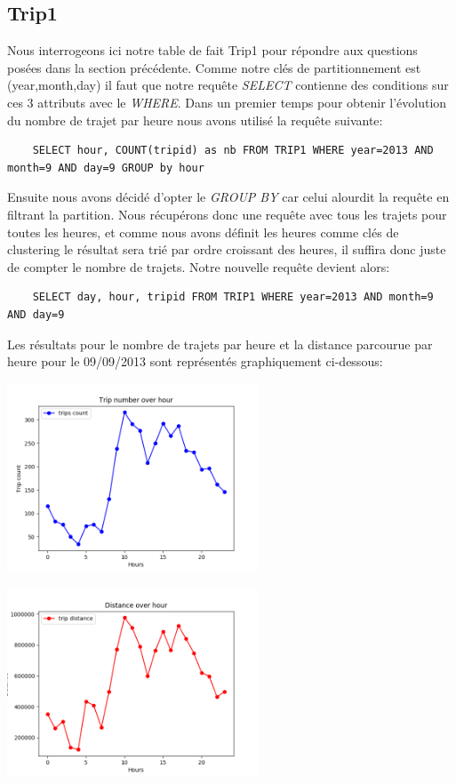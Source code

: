 \documentclass[]{report}
\begin{document}
	\subsection{Trip1}
	Nous interrogeons ici notre table de fait Trip1 pour répondre aux questions posées dans la section précédente. Comme notre clés de partitionnement est (year,month,day) il faut que notre requête \textit{SELECT} contienne des conditions sur ces 3 attributs avec le \textit{WHERE}. Dans un premier temps pour obtenir l'évolution du nombre de trajet par heure nous avons utilisé la requête suivante:
	\begin{lstlisting}
	SELECT hour, COUNT(tripid) as nb FROM TRIP1 WHERE year=2013 AND month=9 AND day=9 GROUP by hour
	\end{lstlisting}
	Ensuite nous avons décidé d'opter le \textit{GROUP BY} car celui alourdit la requête en filtrant la partition. Nous récupérons donc une requête avec tous les trajets pour toutes les heures, et comme nous avons définit les heures comme clés de clustering le résultat sera trié par ordre croissant des heures, il suffira donc juste de compter le nombre de trajets. Notre nouvelle requête devient alors:
	\begin{lstlisting}
	SELECT day, hour, tripid FROM TRIP1 WHERE year=2013 AND month=9 AND day=9
	\end{lstlisting}
	Les résultats pour le nombre de trajets par heure et la distance parcourue par heure pour le 09/09/2013 sont représentés graphiquement ci-dessous:\\
	\begin{minipage}{.5\textwidth}
		\includegraphics[width=75mm]{Figures/trips_by_day.png}
	\end{minipage}%
	\hspace{0.06\linewidth}
	\begin{minipage}{.5\textwidth}
		\includegraphics[width=75mm]{Figures/distance_by_day.png}
	\end{minipage}
	
\end{document}

